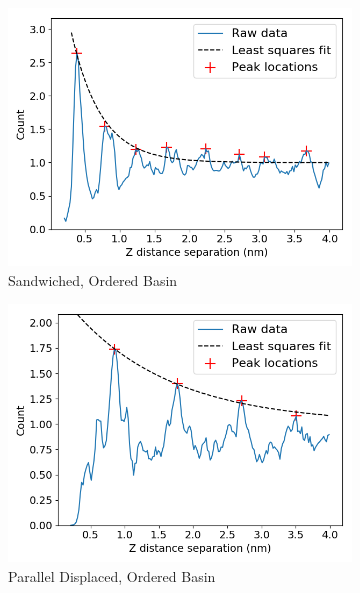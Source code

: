 \documentclass[journal=jpcbfk,manuscript=article]{achemso}
\begin{document}
  \begin{figure}[!htb]
  \centering
  \begin{subfigure}{0.45\textwidth}
  \centering
  \includegraphics[width=\textwidth]{z_correlation_sandwich.png}
  \caption{Sandwiched, Ordered Basin}\label{fig:z_correlation_sandwich}
  \end{subfigure}  
  \begin{subfigure}{0.45\textwidth}
  \centering
  \includegraphics[width=\textwidth]{z_correlation_offset.png}
  \caption{Parallel Displaced, Ordered Basin}\label{fig:z_correlation_offset}
  \end{subfigure}  
  \begin{subfigure}{0.45\textwidth}
  \centering

\end{subfigure}
\end{figure}
\end{document}
